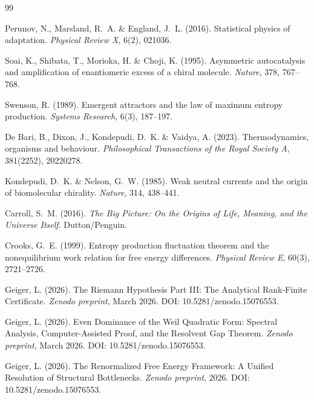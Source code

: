 \documentclass[12pt,a4paper]{article}
\theoremstyle{remark}
\begin{document}
\begin{thebibliography}{99}

Perunov, N., Marsland, R.~A. \& England, J.~L. (2016).
\newblock Statistical physics of adaptation.
\newblock \textit{Physical Review X}, 6(2), 021036.

Soai, K., Shibata, T., Morioka, H. \& Choji, K. (1995).
\newblock Asymmetric autocatalysis and amplification of enantiomeric excess of a chiral molecule.
\newblock \textit{Nature}, 378, 767--768.

Swenson, R. (1989).
\newblock Emergent attractors and the law of maximum entropy production.
\newblock \textit{Systems Research}, 6(3), 187--197.

De Bari, B., Dixon, J., Kondepudi, D.~K. \& Vaidya, A. (2023).
\newblock Thermodynamics, organisms and behaviour.
\newblock \textit{Philosophical Transactions of the Royal Society A}, 381(2252), 20220278.

Kondepudi, D.~K. \& Nelson, G.~W. (1985).
\newblock Weak neutral currents and the origin of biomolecular chirality.
\newblock \textit{Nature}, 314, 438--441.

Carroll, S.~M. (2016).
\newblock \textit{The Big Picture: On the Origins of Life, Meaning, and the Universe Itself}.
\newblock Dutton/Penguin.

Crooks, G.~E. (1999).
\newblock Entropy production fluctuation theorem and the nonequilibrium work relation for free energy differences.
\newblock \textit{Physical Review E}, 60(3), 2721--2726.

Geiger, L. (2026).
\newblock The Riemann Hypothesis Part III: The Analytical Rank-Finite Certificate.
\newblock \textit{Zenodo preprint}, March 2026.
\newblock DOI: 10.5281/zenodo.15076553.

Geiger, L. (2026).
\newblock Even Dominance of the Weil Quadratic Form: Spectral Analysis, Computer-Assisted Proof, and the Resolvent Gap Theorem.
\newblock \textit{Zenodo preprint}, March 2026.
\newblock DOI: 10.5281/zenodo.15076553. %

Geiger, L. (2026).
\newblock The Renormalized Free Energy Framework: A Unified Resolution of Structural Bottlenecks.
\newblock \textit{Zenodo preprint}, 2026.
\newblock DOI: 10.5281/zenodo.15076553. %


\end{thebibliography}
\end{document}
